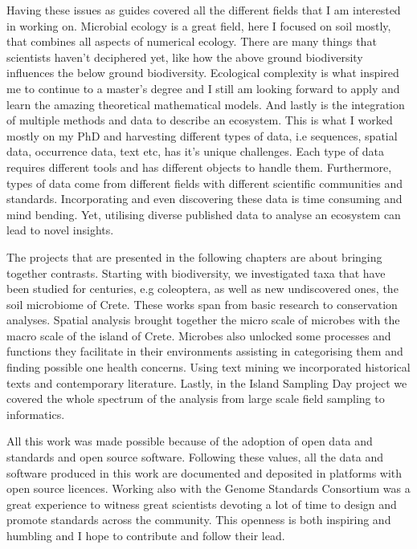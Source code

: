 \documentclass[
11pt, %
english, %
singlespacing, %
liststotoc, %
toctotoc, %
headsepline, %
]{MastersDoctoralThesis} %
\begin{document}
Having these issues as guides covered all the different fields that I am interested 
in working on. Microbial ecology is a great field, here I focused on soil mostly, that
combines all aspects of numerical ecology. There are many things that scientists 
haven't deciphered yet, like how the above ground biodiversity influences the below
ground biodiversity. Ecological complexity is what inspired me to continue to a 
master's degree and I still am looking forward to apply and learn the amazing 
theoretical mathematical models. And lastly is the integration of multiple methods 
and data to describe an ecosystem. This is what I worked mostly on my PhD and 
harvesting different types of data, i.e sequences, spatial data, occurrence data, 
text etc, has it's unique challenges. Each type of data requires different tools and has 
different objects to handle them. Furthermore, types of data come from different 
fields with different scientific communities and standards. Incorporating and even 
discovering these data is time consuming and mind bending. Yet, utilising diverse 
published data to analyse an ecosystem can lead to novel insights. 

The projects that are presented in the following chapters are about 
bringing together contrasts. Starting with biodiversity, we investigated taxa that 
have been studied for centuries, e.g coleoptera, as well as new undiscovered ones, the soil microbiome of 
Crete. These works span from basic research to conservation analyses. 
Spatial analysis brought together the micro scale of microbes with the macro
scale of the island of Crete.
Microbes also unlocked some processes and functions they facilitate in their environments assisting in
categorising them and finding possible one health concerns.
Using text mining we incorporated historical texts and contemporary literature.
Lastly, in the Island Sampling Day project we covered
the whole spectrum of the analysis from large scale field sampling to informatics.

All this work was made possible because of the adoption of open data and standards
and open source software. Following these values, all the data and software produced
in this work are documented and deposited in platforms with open source licences. 
Working also with the Genome Standards Consortium was a great experience to witness
great scientists devoting a lot of time to design and promote standards across the 
community. This openness is both inspiring and humbling and I hope to contribute and follow 
their lead.
\end{document}
